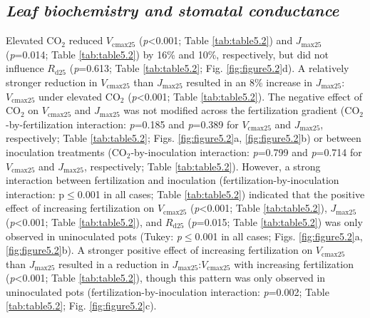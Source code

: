 \subsection{\textit{Leaf biochemistry and stomatal conductance}}
\noindent Elevated CO$_2$ reduced $V_\mathrm{cmax25}$ (\textit{p}<0.001; Table \ref{tab:table5.2}) and $J_\mathrm{max25}$ (\textit{p}=0.014; Table \ref{tab:table5.2}) by 16\% and 10\%, respectively, but did not influence $R_\mathrm{d25}$ (\textit{p}=0.613; Table \ref{tab:table5.2}; Fig. \ref{fig:figure5.2}d). A relatively stronger reduction in $V_\mathrm{cmax25}$ than $J_\mathrm{max25}$ resulted in an 8\% increase in $J_\mathrm{max25}$:$V_\mathrm{cmax25}$ under elevated CO$_2$ (\textit{p}<0.001; Table \ref{tab:table5.2}). The negative effect of CO$_2$ on $V_\mathrm{cmax25}$ and $J_\mathrm{max25}$ was not modified across the fertilization gradient (CO$_2$-by-fertilization interaction: \textit{p}=0.185 and \textit{p}=0.389 for $V_\mathrm{cmax25}$ and $J_\mathrm{max25}$, respectively; Table \ref{tab:table5.2}; Figs. \ref{fig:figure5.2}a, \ref{fig:figure5.2}b) or between inoculation treatments (CO$_2$-by-inoculation interaction: \textit{p}=0.799 and \textit{p}=0.714 for $V_\mathrm{cmax25}$ and $J_\mathrm{max25}$, respectively; Table \ref{tab:table5.2}). However, a strong interaction between fertilization and inoculation (fertilization-by-inoculation interaction: p$\le$0.001 in all cases; Table \ref{tab:table5.2}) indicated that the  positive effect of increasing fertilization on $V_\mathrm{cmax25}$ (\textit{p}<0.001; Table \ref{tab:table5.2}), $J_\mathrm{max25}$ (\textit{p}<0.001; Table \ref{tab:table5.2}), and $R_\mathrm{d25}$ (\textit{p}=0.015; Table \ref{tab:table5.2}) was only observed in uninoculated pots (Tukey: \textit{p}$\le$0.001 in all cases; Figs. \ref{fig:figure5.2}a, \ref{fig:figure5.2}b). A stronger positive effect of increasing fertilization on $V_\mathrm{cmax25}$ than $J_\mathrm{max25}$ resulted in a reduction in $J_\mathrm{max25}$:$V_\mathrm{cmax25}$ with increasing fertilization (\textit{p}<0.001; Table \ref{tab:table5.2}), though this pattern was only observed in uninoculated pots (fertilization-by-inoculation interaction: \textit{p}=0.002; Table \ref{tab:table5.2}; Fig. \ref{fig:figure5.2}c).

